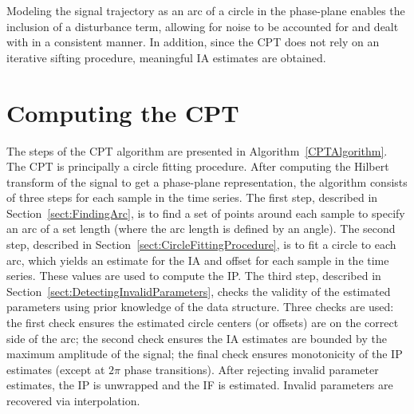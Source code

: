 \documentclass[11pt,draftcls,onecolumn]{IEEEtran}
\newcommand{\todo}[1]{\textsf{\emph{\textbf{\textcolor{blue}{#1}}}}}
\begin{document}
Modeling the signal trajectory as an arc of a circle in the phase-plane enables the inclusion of a disturbance term, allowing for noise to be accounted for and dealt with in a consistent manner. In addition, since the CPT does not rely on an iterative sifting procedure, meaningful IA estimates are obtained.



\section{Computing the CPT}\label{sect:ComputingCPTSection}
The steps of the CPT algorithm are presented in Algorithm~\ref{CPTAlgorithm}. The CPT is principally a circle fitting procedure. After computing the Hilbert transform of the signal to get a phase-plane representation, the algorithm consists of three steps for each sample in the time series. 
The first step, described in Section~\ref{sect:FindingArc}, is to find a set of points around each sample to specify an arc of a set length (where the arc length is defined by an angle). The second step, described in Section~\ref{sect:CircleFittingProcedure}, is to fit a circle to each arc, which yields an estimate for the IA and offset for each sample in the time series. These values are used to compute the IP. The third step, described in Section~\ref{sect:DetectingInvalidParameters}, checks the validity of the estimated parameters using prior knowledge of the data structure. Three checks are used: the first check ensures the estimated circle centers (or offsets) are on the correct side of the arc; the second check ensures the IA estimates are bounded by the maximum amplitude of the signal; the final check ensures monotonicity of the IP estimates (except at $2\pi$ phase transitions). After rejecting invalid parameter estimates, the IP is unwrapped and the IF is estimated. Invalid parameters are recovered via interpolation. 
\end{document}
